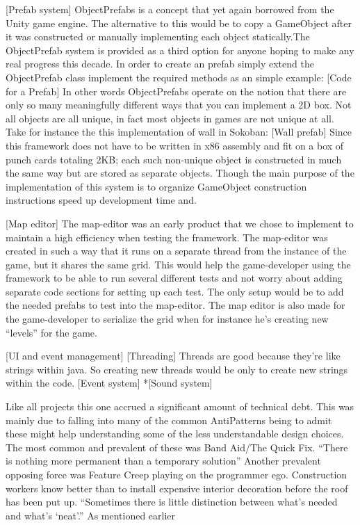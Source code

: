 \documentclass{article}
\begin{document}
[Prefab system]
ObjectPrefabs is a concept that yet again borrowed from the Unity game engine. 
The alternative to this would be to copy a GameObject after it was constructed or manually implementing each object statically.The ObjectPrefab system is provided as a third option for anyone hoping to make any real progress this decade. In order to create an prefab simply extend the ObjectPrefab class implement the required methods as an simple example:
	[Code for a Prefab]
In other words ObjectPrefabs operate on the notion that there are only so many meaningfully different ways that you can implement a 2D box. Not all objects are all unique, in fact most objects in games are not unique at all. Take for instance the this implementation of wall in Sokoban: 
	[Wall prefab]
Since this framework does not have to be written in x86 assembly and fit on a box of punch cards totaling 2KB; each such non-unique object is constructed in much the same way but are stored as separate objects. Though the main purpose of the implementation of this system is to organize GameObject construction instructions speed up development time and.

[Map editor]
The map-editor was an early product that we chose to implement to maintain a high efficiency when testing the framework. The map-editor was created in such a way that it runs on a separate thread from the instance of the game, but it shares the same grid. This would help the game-developer using the framework to be able to run several different tests and not worry about adding separate code sections for setting up each test. The only setup would be to add the needed prefabs to test into the map-editor. The map editor is also made for the game-developer to serialize the grid when for instance he’s creating new “levels” for the game.

[UI and event management]
[Threading]
Threads are good because they’re like strings within java. So creating new threads would be only to create new strings within the code.
[Event system]
*[Sound system]

Like all projects this one accrued a significant amount of technical debt. This was mainly due to falling into many of the common AntiPatterns being to admit these might help understanding some of the less understandable design choices. The most common and prevalent of these was Band Aid/The Quick Fix. 
“There is nothing more permanent than a temporary solution”
Another prevalent opposing force was Feature Creep playing on the programmer ego. Construction workers know better than to install expensive interior decoration before the roof has been put up.
“Sometimes there is little distinction between what's needed and what's ‘neat’.”
As mentioned earlier 
\end{document}
